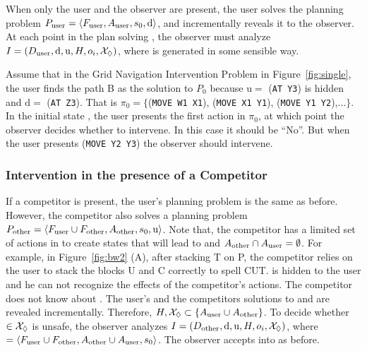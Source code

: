 When only the user and the observer are present, the user solves the planning problem $P_{\textnormal{user}}=\langle F_{\textnormal{user}}, A_{\textnormal{user}}, s_0, \mathrm{d}\rangle$, and incrementally reveals it to the observer. 
At each point in the plan solving \problemUser, the observer must analyze $I = (D_{\textnormal{user}}, \mathrm{d}, \mathrm{u}, H, o_i, \mathcal{X}_\Diamond)$, where \Suffixes is generated in some sensible way.

Assume that in the Grid Navigation Intervention Problem in Figure~\ref{fig:single}, the user finds the path B as the solution to $P_0$ because $\mathrm{u}= $ (\texttt{AT Y3}) is hidden and $\mathrm{d}= $ (\texttt{\textsc{AT Z3}}).
That is $\pi_0=\lbrace$(\texttt{\textsc{MOVE W1 X1}}), (\texttt{\textsc{MOVE X1 Y1}}), (\texttt{\textsc{MOVE Y1 Y2}}),$\ldots\rbrace$.
In the initial state \initialState, the user presents the first action in $\pi_0$, at which point the observer decides whether to intervene.
In this case it should be ``No''.
But when the user presents (\texttt{\textsc{MOVE Y2 Y3}}) the observer should intervene.


\subsubsection{Intervention in the presence of a Competitor}
If a competitor is present, the user's planning problem \problemUser  is the same as before. 
However, the competitor also solves a planning problem $P_{\textnormal{other}}=\langle F_{\textnormal{user}} \cup F_{\textnormal{other}}, A_{\textnormal{other}}, s_0, \mathrm{u}\rangle$.
Note that, the competitor has a limited set of actions in \actionsOther to create states that will lead to \undesired and $A_{\textnormal{other}}\cap A_{\textnormal{user}}=\emptyset$.
For example, in Figure~\ref{fig:bw2} (A), after stacking T on P, the competitor relies on the user to stack the blocks U and C correctly to spell CUT.
\undesired is hidden to the user and he can not recognize the effects of the competitor's actions. The competitor does not know about \desired.
The user's and the competitors solutions to \problemUser and \problemOther are revealed incrementally.
Therefore, $H,\mathcal{X}_\Diamond \subset \lbrace A_{\textnormal{user}}\cup A_{\textnormal{other}}\rbrace$. 
To decide whether \Suffix $\in\mathcal{X}_\Diamond$ is unsafe, the observer analyzes $I = (D_{\textnormal{other}}, \mathrm{d}, \mathrm{u}, H, o_i, \mathcal{X}_\Diamond)$, where \domainOther$=\langle F_{\textnormal{user}} \cup F_{\textnormal{other}},A_{\textnormal{other}}\cup A_{\textnormal{user}},s_0\rangle$.
The observer accepts \presentedAction into \historyDef as before.


